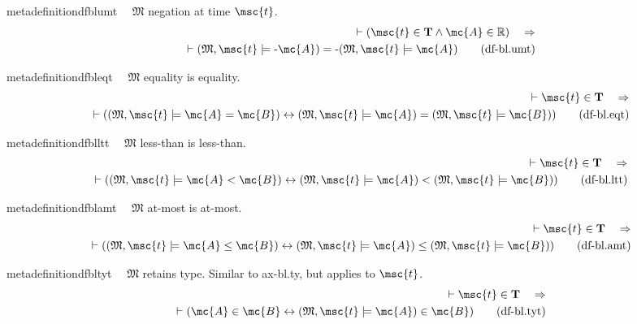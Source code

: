 \begin{restatable}{metadefinition}{dfblumt}~~ $\mathfrak{M}$ negation at time
$\msc{t}$.
\begin{align}
\vdash ( \msc{t} \in \mathbf{T} \wedge \mc{A} \in \mathbb{R}
    )\quad\Rightarrow \notag \\ 
	\quad \vdash ( \mathfrak{M} , \msc{t} \models \textrm{-}
    \mc{A} ) = \textrm{-} ( \mathfrak{M} , \msc{t} \models \mc{A}
    )\label{eq:df-bl.umt}\tag{df-bl.umt}
\end{align}
\end{restatable}

\begin{restatable}{metadefinition}{dfbleqt}~~ $\mathfrak{M}$ equality is equality.
\begin{align}
\vdash \msc{t} \in \mathbf{T}\quad\Rightarrow \notag \\ 
	\quad \vdash ( ( \mathfrak{M} ,
    \msc{t} \models \mc{A} = \mc{B} ) \leftrightarrow ( \mathfrak{M} , \msc{t}
    \models \mc{A} ) = ( \mathfrak{M} , \msc{t} \models \mc{B} )
    )\label{eq:df-bl.eqt}\tag{df-bl.eqt}
\end{align}
\end{restatable}

\begin{restatable}{metadefinition}{dfblltt}~~ $\mathfrak{M}$ less-than is less-than.
\begin{align}
\vdash \msc{t} \in \mathbf{T}\quad\Rightarrow \notag \\ 
	\quad \vdash ( ( \mathfrak{M} ,
    \msc{t} \models \mc{A} < \mc{B} ) \leftrightarrow ( \mathfrak{M} , \msc{t}
    \models \mc{A} ) < ( \mathfrak{M} , \msc{t} \models \mc{B} )
    )\label{eq:df-bl.ltt}\tag{df-bl.ltt}
\end{align}
\end{restatable}

\begin{restatable}{metadefinition}{dfblamt}~~ $\mathfrak{M}$ at-most is at-most.
\begin{align}
\vdash \msc{t} \in \mathbf{T}\quad\Rightarrow \notag \\ 
	\quad \vdash ( ( \mathfrak{M} ,
    \msc{t} \models \mc{A} \le \mc{B} ) \leftrightarrow ( \mathfrak{M} ,
    \msc{t} \models \mc{A} ) \le ( \mathfrak{M} , \msc{t} \models \mc{B} )
    )\label{eq:df-bl.amt}\tag{df-bl.amt}
\end{align}
\end{restatable}

\begin{restatable}{metadefinition}{dfbltyt}~~ $\mathfrak{M}$ retains type.
  Similar to ax-bl.ty, but applies to $\msc{t}$.
\begin{align}
\vdash \msc{t} \in \mathbf{T}\quad\Rightarrow \notag \\ 
	\quad \vdash ( \mc{A} \in \mc{B}
    \leftrightarrow ( \mathfrak{M} , \msc{t} \models \mc{A} ) \in \mc{B}
    )\label{eq:df-bl.tyt}\tag{df-bl.tyt}
\end{align}
\end{restatable}

